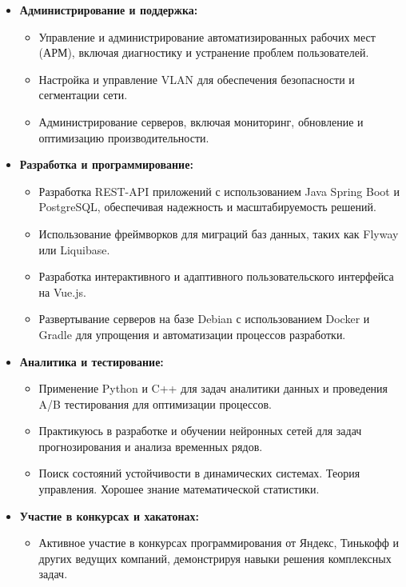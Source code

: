 \documentclass[a4paper,10pt]{article}
\begin{document}
\begin{itemize}
    \item \textbf{Администрирование и поддержка:}
    \begin{itemize}
        \item Управление и администрирование автоматизированных рабочих мест (АРМ), включая диагностику и устранение проблем пользователей.
        \item Настройка и управление VLAN для обеспечения безопасности и сегментации сети.
        \item Администрирование серверов, включая мониторинг, обновление и оптимизацию производительности.
    \end{itemize}

    \item \textbf{Разработка и программирование:}
    \begin{itemize}
        \item Разработка REST-API приложений с использованием Java Spring Boot и PostgreSQL, обеспечивая надежность и масштабируемость решений.
        \item Использование фреймворков для миграций баз данных, таких как Flyway или Liquibase.
        \item Разработка интерактивного и адаптивного пользовательского интерфейса на Vue.js.
        \item Развертывание серверов на базе Debian с использованием Docker и Gradle для упрощения и автоматизации процессов разработки.
    \end{itemize}

    \item \textbf{Аналитика и тестирование:}
    \begin{itemize}
        \item Применение Python и C++ для задач аналитики данных и проведения A/B тестирования для оптимизации процессов.
        \item Практикуюсь в разработке и обучении нейронных сетей для задач прогнозирования и анализа временных рядов.
        \item Поиск состояний устойчивости в динамических системах. Теория управления. Хорошее знание математической статистики. 
    \end{itemize}

    \item \textbf{Участие в конкурсах и хакатонах:}
    \begin{itemize}
        \item Активное участие в конкурсах программирования от Яндекс, Тинькофф и других ведущих компаний, демонстрируя навыки решения комплексных задач.
    \end{itemize}


\end{itemize}
\end{document}

